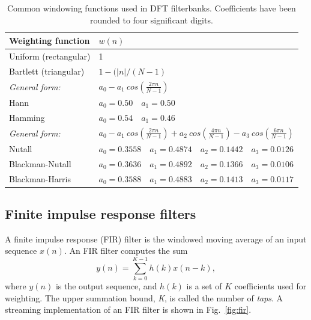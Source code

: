 \documentclass{ws-rv961x669}
\begin{document}
\begin{table}
	\caption{Common windowing functions used in DFT filterbanks. Coefficients have been rounded to four significant digits. \label{tab:window_fns}}
	\begin{tabular}{l l }
	\hline
	Weighting function      & $w(n)$                        			\\
	\hline
	\hline
	Uniform  (rectangular)   &  1                           			\\
	Bartlett (triangular)    &  $1 - (|n| / (N-1)$               	\\
	\hline
	\emph{General form:}    & $a_0 - a_1~cos(\frac{2\pi n}{N-1})$ \\
	Hann                     & $a_0=0.50 \quad a_1 = 0.50$ 	\\
	Hamming             & $ a_0 = 0.54 \quad a_1 = 0.46$   	\\
	\hline
	
	 \emph{General form:} &$a_0 - a_1~cos(\frac{2\pi n}{N-1}) + a_2~cos(\frac{4\pi n}{N-1}) -
	 					   a_3~cos(\frac{6\pi n}{N-1}) $	 \\
	 Nutall          & $a_0=0.3558\quad a_1=0.4874\quad a_2=0.1442\quad a_3=0.0126$ \\
	 Blackman-Nutall & $a_0=0.3636\quad a_1=0.4892\quad a_2=0.1366\quad a_3=0.0106$ \\
	 Blackman-Harris & $a_0=0.3588\quad a_1=0.4883\quad a_2=0.1413\quad a_3=0.0117$ \\
	\hline
	\end{tabular}

\end{table}



\subsection{Finite impulse response filters}\label{sec:filters}

A finite impulse response (FIR) filter is the windowed moving average of an input sequence $x(n)$. An FIR filter computes the sum 
\begin{equation} 
y(n)=\sum_{k=0}^{K-1}h(k)x(n-k),\label{eq:FIR-filter}
\end{equation}
where $y(n)$ is the output sequence, and $h(k)$ is a set of $K$ coefficients used for weighting. The upper summation bound, \emph{K}, is called the number of \emph{taps}. A streaming implementation of an FIR filter is shown in Fig.~\ref{fig:fir}.
\end{document}
